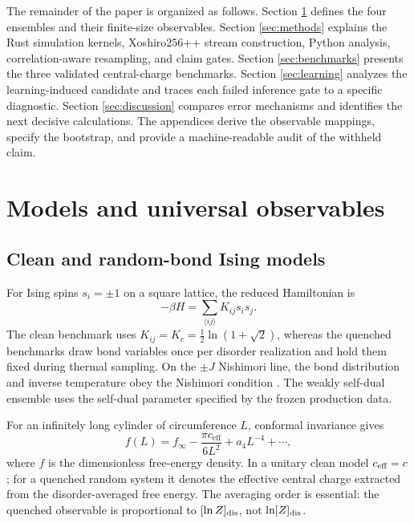 \documentclass[aps,prb,reprint,superscriptaddress,longbibliography,floatfix]{revtex4-2}
\begin{document}
The remainder of the paper is organized as follows.  Section
\ref{sec:models} defines the four ensembles and their finite-size observables.
Section \ref{sec:methods} explains the Rust simulation kernels, Xoshiro256++
stream construction, Python analysis, correlation-aware resampling, and
claim gates.  Section \ref{sec:benchmarks} presents the three validated
central-charge benchmarks.  Section \ref{sec:learning} analyzes the
learning-induced candidate and traces each failed inference gate to a
specific diagnostic.  Section \ref{sec:discussion} compares error mechanisms
and identifies the next decisive calculations.  The appendices derive the
observable mappings, specify the bootstrap, and provide a machine-readable
audit of the withheld claim.

\section{Models and universal observables}
\label{sec:models}

\subsection{Clean and random-bond Ising models}

For Ising spins $s_i=\pm1$ on a square lattice, the reduced Hamiltonian is
\begin{equation}
  -\beta H=\sum_{\langle ij\rangle}K_{ij}s_i s_j .
  \label{eq:ising-hamiltonian}
\end{equation}
The clean benchmark uses $K_{ij}=K_c=\tfrac12\ln(1+\sqrt2)$, whereas the
quenched benchmarks draw bond variables once per disorder realization and
hold them fixed during thermal sampling.  On the $\pm J$ Nishimori line, the
bond distribution and inverse temperature obey the Nishimori condition
\cite{Nishimori1981}.  The weakly self-dual ensemble uses the self-dual
parameter specified by the frozen production data.

For an infinitely long cylinder of circumference $L$, conformal invariance
gives
\begin{equation}
  f(L)=f_\infty-\frac{\pi c_{\mathrm{eff}}}{6L^2}
  +a_4L^{-4}+\cdots ,
  \label{eq:casimir}
\end{equation}
where $f$ is the dimensionless free-energy density.  In a unitary clean model
$c_{\rm eff}=c$; for a quenched random system it denotes the effective central
charge extracted from the disorder-averaged free energy.  The averaging order
is essential: the quenched observable is proportional to
$[\ln Z]_{\rm dis}$, not $\ln[Z]_{\rm dis}$.
\end{document}
